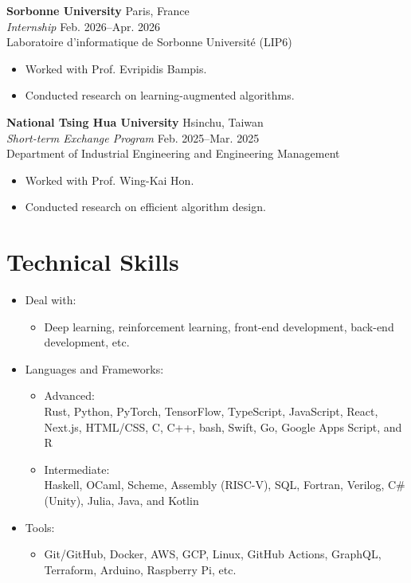 \documentclass{article}
\begin{document}
\textbf{Sorbonne University}
\hspace{\fill}Paris, France\\
\textit{Internship}
\hspace{\fill}Feb. 2026--Apr. 2026\\
Laboratoire d’informatique de Sorbonne Université (LIP6)
\begin{itemize}[parsep=0pt, after=\vspace{5pt}]
  \item Worked with Prof. Evripidis Bampis.
  \item Conducted research on learning-augmented algorithms.
\end{itemize}

\textbf{National Tsing Hua University}
\hspace{\fill}Hsinchu, Taiwan\\
\textit{Short-term Exchange Program}
\hspace{\fill}Feb. 2025--Mar. 2025\\
Department of Industrial Engineering and Engineering Management
\begin{itemize}[parsep=0pt, after=\vspace{5pt}]
  \item Worked with Prof. Wing-Kai Hon.
  \item Conducted research on efficient algorithm design.
\end{itemize}


\section{Technical Skills}

\begin{itemize}[parsep=-2pt]
  \item Deal with:
  \begin{itemize}[parsep=0pt, after=\vspace{5pt}]
    \item Deep learning, reinforcement learning, front-end development, back-end development, etc.
  \end{itemize}
  \item Languages and Frameworks:
  \begin{itemize}[parsep=0pt, after=\vspace{5pt}]
    \item Advanced:\\
      Rust, Python, PyTorch, TensorFlow, TypeScript, JavaScript, React, Next.js, HTML/CSS, C, C++, bash, Swift, Go, Google Apps Script, and R
    \item Intermediate:\\
      Haskell, OCaml, Scheme, Assembly (RISC-V), SQL, Fortran, Verilog, C\# (Unity), Julia, Java, and Kotlin
  \end{itemize}
  \item Tools:
  \begin{itemize}[parsep=0pt, after=\vspace{5pt}]
    \item Git/GitHub, Docker, AWS, GCP, Linux, GitHub Actions, GraphQL, Terraform, Arduino, Raspberry Pi, etc.
  \end{itemize}
\end{itemize}
\end{document}
